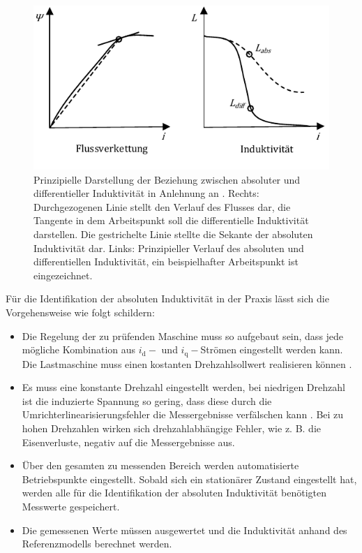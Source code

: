 \documentclass[conference,twocolumn]{IEEEtran}
\newcommand{\x}[1]{\mathrm{#1}}
\begin{document}
\begin{figure}[!h]
\centering
\includegraphics[width=\columnwidth]{img/induktiv}
\caption{Prinzipielle Darstellung der Beziehung zwischen absoluter und differentieller Induktivität in Anlehnung an \textcite[S.~2]{kellner_general_2011}. Rechts: Durchgezogenen Linie stellt den Verlauf des Flusses dar, die Tangente in dem Arbeitspunkt soll die differentielle Induktivität darstellen. Die gestrichelte Linie stellte die Sekante der absoluten Induktivität dar. Links: Prinzipieller Verlauf des absoluten und differentiellen Induktivität, ein beispielhafter Arbeitspunkt ist eingezeichnet.}
\label{fig:induktiv}
\end{figure}

Für die Identifikation der absoluten Induktivität in der Praxis lässt sich die Vorgehensweise wie folgt schildern:

\begin{itemize}
\item Die Regelung der zu prüfenden Maschine muss so aufgebaut sein, dass jede mögliche Kombination aus $i_\x{d}-$ und $i_\x{q}-$Strömen eingestellt werden kann. Die Lastmaschine muss einen kostanten Drehzahlsollwert realisieren können \autocite{Kellner2012}.
\item Es muss eine konstante Drehzahl eingestellt werden, bei niedrigen Drehzahl ist die induzierte Spannung so gering, dass diese durch die Umrichterlinearisierungsfehler die Messergebnisse verfälschen kann \autocite{Perassi2006}. Bei zu hohen Drehzahlen wirken sich drehzahlabhängige Fehler, wie z. B. die Eisenverluste, negativ auf die Messergebnisse aus.
\item Über den gesamten zu messenden Bereich werden automatisierte Betriebspunkte eingestellt. Sobald sich ein stationärer Zustand eingestellt hat, werden alle für die Identifikation der absoluten Induktivität benötigten Messwerte gespeichert.
\item Die gemessenen Werte müssen ausgewertet und die Induktivität anhand des Referenzmodells berechnet werden.
\end{itemize}
\end{document}
